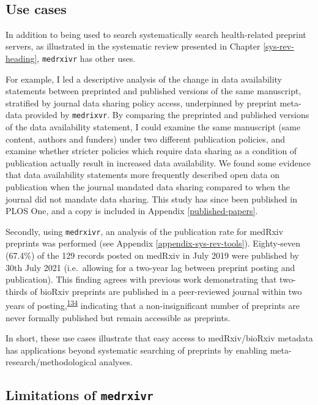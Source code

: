 \documentclass[a4paper, twoside]{templates/ociamthesis}
\begin{document}
~

\hypertarget{use-cases}{%
\subsection{Use cases}\label{use-cases}}

In addition to being used to search systematically search health-related preprint servers, as illustrated in the systematic review presented in Chapter \ref{sys-rev-heading}, \texttt{medrxivr} has other uses.

For example, I led a descriptive analysis of the change in data availability statements between preprinted and published versions of the same manuscript, stratified by journal data sharing policy access, underpinned by preprint meta-data provided by \texttt{medrixvr}. By comparing the preprinted and published versions of the data availability statement, I could examine the same manuscript (same content, authors and funders) under two different publication policies, and examine whether stricter policies which require data sharing as a condition of publication actually result in increased data availability. We found some evidence that data availability statements more frequently described open data on publication when the journal mandated data sharing compared to when the journal did not mandate data sharing. This study has since been published in PLOS One, and a copy is included in Appendix \ref{published-papers}.

Secondly, using \texttt{medrxivr}, an analysis of the publication rate for medRxiv preprints was performed (see Appendix \ref{appendix-sys-rev-tools}). Eighty-seven (67.4\%) of the 129 records posted on medRxiv in July 2019 were published by 30th July 2021 (i.e.~allowing for a two-year lag between preprint posting and publication). This finding agrees with previous work demonstrating that two-thirds of bioRxiv preprints are published in a peer-reviewed journal within two years of posting,\textsuperscript{\protect\hyperlink{ref-abdill2019popularity}{134}} indicating that a non-insignificant number of preprints are never formally published but remain accessible as preprints.

In short, these use cases illustrate that easy access to medRxiv/bioRxiv metadata has applications beyond systematic searching of preprints by enabling meta-research/methodological analyses.

\hypertarget{medrxivr-limitations}{%
\subsection{\texorpdfstring{Limitations of \texttt{medrxivr}}{Limitations of medrxivr}}\label{medrxivr-limitations}}
\end{document}

